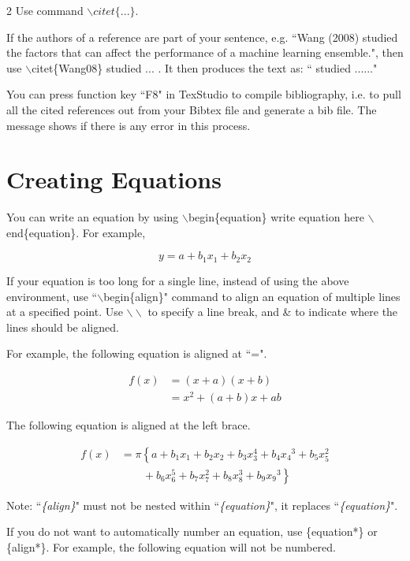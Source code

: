 2 Use command $\backslash citet\{...\}$.

If the authors of a reference are part of your sentence, e.g. ``Wang (2008) studied the factors that can affect the performance of a machine learning ensemble.", then use $\backslash$citet\{Wang08\} studied ... . It then produces the text as: `` \citet{Wang08} studied ......" 
  
You can press function key ``F8" in TexStudio to compile bibliography, i.e. to pull all the cited references out from your Bibtex file and generate a bib file. The message shows if there is any error in this process.       

\section{Creating Equations}

You can write an equation by using $\backslash$begin\{equation\} write equation here $\backslash$ end\{equation\}. For example, 

\begin{equation}
y = a + b_1x_1 + b_2x_2
\end{equation}

If your equation is too long for a single line, instead of using the above environment,  
use ``$\backslash$begin\{align\}" command to align an equation of multiple lines at a specified point. 
Use $\backslash\backslash$ to specify a line break, and \& to indicate where  the lines should be aligned. 

For example, the following equation is aligned at ``=". 

\begin{align}
f(x) &= (x+a)(x+b) \nonumber \\
&= x^2 + (a+b)x + ab
\end{align}

The following equation is aligned at the left brace.  

\begin{align}
f(x) &= \pi \left\{ a + b_1x_1 + b_2x_2+ b_3x_3^4 + b_4{x_4}^3 + b_5x_5^2 \right.\nonumber\\
&\qquad \left. {} + b_6x_6^5 + b_7x_7^2+ b_8x_8^3 + b_9{x_9}^3 \right\}
\end{align}  

Note: ``\emph{\{align\}}" must not be nested within ``\emph{\{equation\}}", it replaces ``\emph{\{equation\}}".

If you do not want to automatically number an equation, use  \{equation*\} or  \{align*\}. For example, the following equation will not be numbered.   

